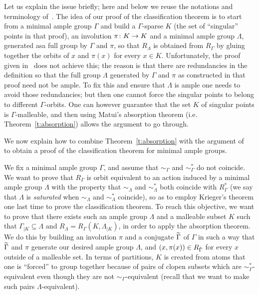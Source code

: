\documentclass[AHL,Unicode]{cedram}
\let\oldtilde\tilde
\renewcommand*{\tilde}[1]{\mathchoice{\widetilde{#1}}{\widetilde{#1}}{\oldtilde{#1}}{\oldtilde{#1}}}
\renewcommand*{\to}{\mathchoice{\longrightarrow}{\rightarrow}{\rightarrow}{\rightarrow}}
\begin{document}
Let us explain the issue briefly; here and below we reuse the notations and terminology of~\cite{Melleray2023}. The idea of our proof of the classification theorem is to start from a minimal ample group $\Gamma$ and build a $\Gamma$-sparse $K$ (the set of ``singular'' points in that proof), an involution $\pi \colon K \to K$ and a minimal ample group $\Lambda$, generated as\linebreak a full group by $\Gamma$ and $\pi$, so that $R_\Lambda$ is obtained from $R_\Gamma$ by gluing together the orbits of $x$ and $\pi(x)$ for every $x \in K$. Unfortunately, the proof given in~\cite{Melleray2023} does not achieve this; the reason is that there are redundancies in the definition so that the full group $\Lambda$ generated by $\Gamma$ and $\pi$ as constructed in that proof need not be ample. To fix this and ensure that $\Lambda$ is ample one needs to avoid those redundancies; but then one cannot force the singular points to belong to different $\Gamma$-orbits. One can however guarantee that the set $K$ of singular points is $\Gamma$-malleable, and then using Matui's absorption theorem (i.e. Theorem~\ref{t:absorption}) allows the argument to go through.

We now explain how to combine Theorem~\ref{t:absorption} with the argument of~\cite{Melleray2023} to obtain a proof of the classification theorem for minimal ample groups.

We fix a minimal ample group $\Gamma$, and assume that $\sim_\Gamma$ and $\sim_\Gamma^*$ do not coincide. We want to prove that $R_\Gamma$ is orbit equivalent to an action induced by a minimal ample group $\Lambda$ with the property that $\sim_\Lambda$ and $\sim_\Lambda^*$ both coincide with $R_\Gamma^*$ (we say that $\Lambda$ is \emph{saturated} when $\sim_\Lambda$ and $\sim_\Lambda^*$ coincide), so as to employ Krieger's theorem one last time to prove the classification theorem. To reach this objective, we want to prove that there exists such an ample group $\Lambda$ and a malleable subset $K$ such that $\Gamma_{|K} \subseteq \Lambda$ and $R_\Lambda=R_{\Gamma}(K,\Lambda_{|K})$, in order to apply the absorption theorem. We do this by building an involution $\pi$ and a conjugate $\tilde \Gamma$ of $\Gamma$ in such a way that $\tilde \Gamma$ and $\pi$ generate our desired ample group $\Lambda$, and $(x,\pi(x)) \in R_{\tilde \Gamma}$ for every $x$ outside of a malleable set. In terms of partitions, $K$ is created from atoms that one is ``forced'' to group together because of pairs of clopen subsets which are $\sim_{\Gamma}^*$-equivalent even though they are not $\sim_\Gamma$-equivalent (recall that we want to make such pairs $\Lambda$-equivalent).
\end{document}
